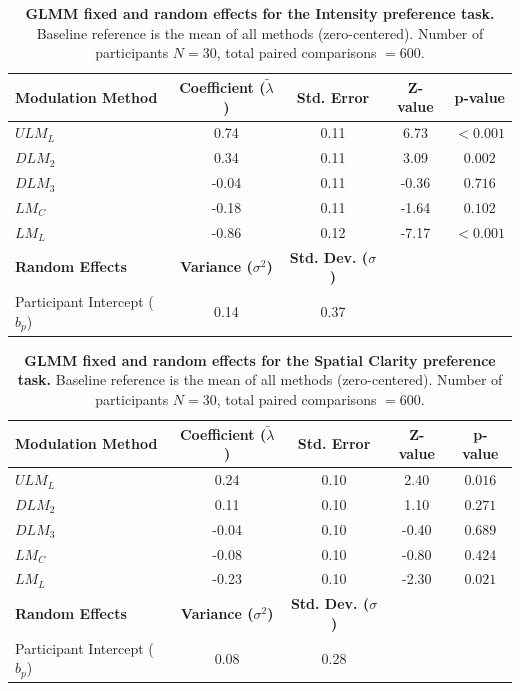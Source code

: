 \documentclass[pdflatex, sn-nature]{sn-jnl}
\theoremstyle{thmstyleone}%
\theoremstyle{thmstyletwo}%
\theoremstyle{thmstylethree}%
\begin{document}
\begin{table}[htbp]
\caption{\textbf{GLMM fixed and random effects for the Intensity preference task.} Baseline reference is the mean of all methods (zero-centered). Number of participants $N=30$, total paired comparisons $=600$.}
\label{tab:glmm_intensity}
\centering
\small
\setlength{\tabcolsep}{0pt}
\begin{tabular*}{\textwidth}{@{\extracolsep{\fill}}lcccc}
\toprule
\textbf{Modulation Method} & \textbf{Coefficient ($\tilde{\lambda}$)} & \textbf{Std. Error} & \textbf{Z-value} & \textbf{p-value} \\
\midrule
$ULM_L$ & 0.74 & 0.11 & 6.73 & $<0.001$ \\
$DLM_2$ & 0.34 & 0.11 & 3.09 & $0.002$ \\
$DLM_3$ & -0.04 & 0.11 & -0.36 & $0.716$ \\
$LM_C$ & -0.18 & 0.11 & -1.64 & $0.102$ \\
$LM_L$ & -0.86 & 0.12 & -7.17 & $<0.001$ \\
\midrule
\textbf{Random Effects} & \textbf{Variance ($\sigma^2$)} & \textbf{Std. Dev. ($\sigma$)} & & \\
\midrule
Participant Intercept ($b_p$) & 0.14 & 0.37 & & \\
\bottomrule
\end{tabular*}
\end{table}

\begin{table}[htbp]
\caption{\textbf{GLMM fixed and random effects for the Spatial Clarity preference task.} Baseline reference is the mean of all methods (zero-centered). Number of participants $N=30$, total paired comparisons $=600$.}
\label{tab:glmm_clarity}
\centering
\small
\setlength{\tabcolsep}{0pt}
\begin{tabular*}{\textwidth}{@{\extracolsep{\fill}}lcccc}
\toprule
\textbf{Modulation Method} & \textbf{Coefficient ($\tilde{\lambda}$)} & \textbf{Std. Error} & \textbf{Z-value} & \textbf{p-value} \\
\midrule
$ULM_L$ & 0.24 & 0.10 & 2.40 & $0.016$ \\
$DLM_2$ & 0.11 & 0.10 & 1.10 & $0.271$ \\
$DLM_3$ & -0.04 & 0.10 & -0.40 & $0.689$ \\
$LM_C$ & -0.08 & 0.10 & -0.80 & $0.424$ \\
$LM_L$ & -0.23 & 0.10 & -2.30 & $0.021$ \\
\midrule
\textbf{Random Effects} & \textbf{Variance ($\sigma^2$)} & \textbf{Std. Dev. ($\sigma$)} & & \\
\midrule
Participant Intercept ($b_p$) & 0.08 & 0.28 & & \\
\bottomrule
\end{tabular*}
\end{table}
\end{document}
